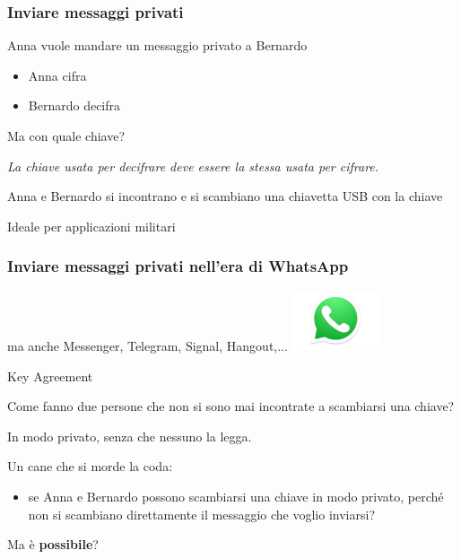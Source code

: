 \documentclass[]{beamer}
\begin{document}
\begin{frame}
\frametitle{Inviare messaggi privati}

{\color{red}Anna vuole mandare un messaggio privato a Bernardo}

\pause

\begin{itemize}
\color{magenta}
\item Anna cifra
\item Bernardo decifra
\end{itemize}

\pause

{\color{red} Ma con quale chiave?}

\begin{center}
\color{brown}
\em
La chiave usata per decifrare \alert{deve} essere la stessa usata per cifrare.
\end{center}

\pause
\vfill
{\color{blue} Anna e Bernardo si incontrano e si scambiano una chiavetta USB con la chiave}

\vfill
{\color{brown} Ideale per applicazioni militari}
\end{frame}

\begin{frame}
\frametitle{Inviare messaggi privati nell'era di WhatsApp}
{\color{magenta} ma anche Messenger, Telegram, Signal, Hangout,...}
\hfill\includegraphics[width=1in]{Images/diamante/whatsapp.jpg}

\pause

\begin{block}{Key Agreement}
\begin{itemize}
{\color{blue}
\item Come fanno due persone che non si sono mai incontrate a scambiarsi
una chiave?
\pause
\item In modo privato, senza che nessuno la legga.
\pause
\item Un cane che si morde la coda:
\begin{itemize}
\item {\color{teal} se Anna e Bernardo possono scambiarsi una chiave in modo privato,
perch\'e non si scambiano direttamente il messaggio che voglio inviarsi?}
\end{itemize}
\pause
\item Ma \`e {\color{brown}\bf possibile}?
}
\end{itemize}
\end{block}
\end{frame}
\end{document}
